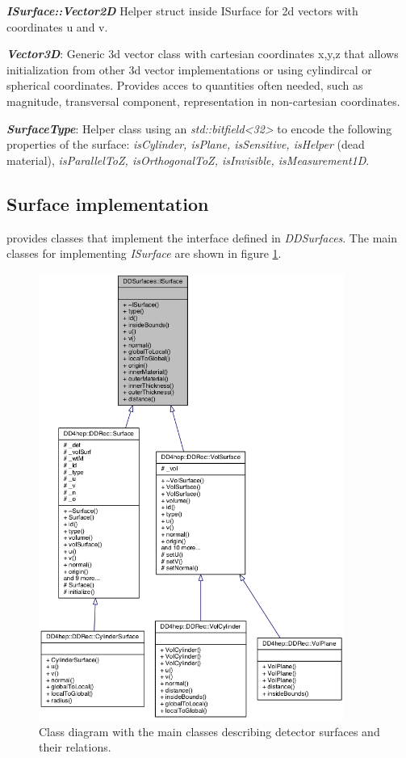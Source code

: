 \documentclass[10pt,a4paper]{article}
\begin{document}
\noindent
{\em \bf ISurface::Vector2D} Helper struct inside ISurface for 2d vectors with coordinates u and v.

\noindent
{\em \bf Vector3D}: Generic 3d vector class with cartesian coordinates x,y,z that allows initialization
from other 3d vector implementations or using cylindircal or spherical coordinates. Provides acces to
quantities often needed, such as magnitude, transversal component, representation in non-cartesian
coordinates.

\noindent
{\em \bf SurfaceType}: Helper class using an {\em std::bitfield<32>} to encode the 
following properties of the surface: {\em isCylinder, isPlane, isSensitive, isHelper} (dead material),
{\em isParallelToZ, isOrthogonalToZ, isInvisible, isMeasurement1D}.

\subsection{Surface implementation}
\label{subsec:ddrec-ddsurfaces}
\DDR provides classes that implement the interface defined in {\em DDSurfaces}.
The main classes for implementing {\em ISurface} are shown in 
figure \ref{fig:ddrec_surfaces_classes}.

\begin{figure}[h]
  \begin{center}
    \includegraphics[width=100mm] {DDRec_surface_classes}
    \caption{Class diagram with the main classes describing detector
      surfaces and their relations.}
    \label{fig:ddrec_surfaces_classes}
  \end{center}
\end{figure}
\end{document}
